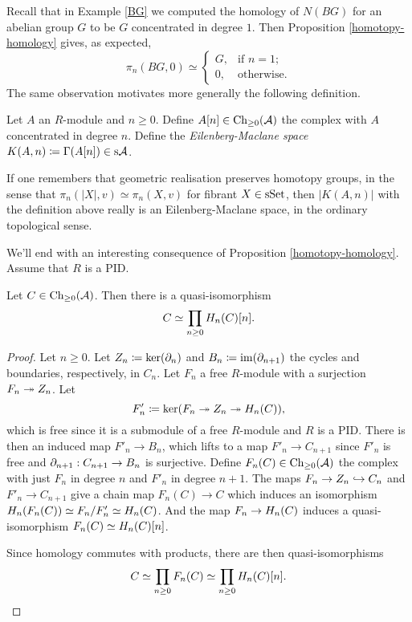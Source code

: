 \begin{remark}
  Recall that in Example \ref{BG} we computed the homology of $N(BG)$
  for an abelian group $G$ to be $G$ concentrated in degree $1$. Then
  Proposition \ref{homotopy-homology} gives, as expected,
  \[
  \pi_n(BG,0) \simeq
  \begin{cases}
    G, & \text{if } n = 1; \\
    0, & \text{otherwise}.
  \end{cases}
  \]
  The same observation motivates more generally the following
  definition.
\end{remark}

\begin{definition}
  Let $A$ an $R$-module and $n \ge 0$. Define $A[n] \in \mathrm{Ch}_{\ge
    0}(\mathcal{A})$ the complex with $A$ concentrated in degree $n$. Define
  the \textit{Eilenberg-Maclane space} $K(A,n) \coloneqq \Gamma(A[n])
  \in \mathrm{s}\mathcal{A}$.
\end{definition}

\begin{remark}
  If one remembers that geometric realisation preserves homotopy
  groups, in the sense that $\pi_n(|X|,v) \simeq \pi_n(X,v)$ for
  fibrant $X \in \mathrm{s}\mathrm{Set}$, then $|K(A,n)|$ with the definition above
  really is an Eilenberg-Maclane space, in the ordinary topological
  sense.
\end{remark}

We'll end with an interesting consequence of Proposition
\ref{homotopy-homology}. Assume that $R$ is a PID.

\begin{lemma}
  \label{quasi-homology}
  Let $C \in \mathrm{Ch}_{\ge 0}(\mathcal{A})$. Then there is a quasi-isomorphism
  \[
  C \simeq \prod_{n \ge 0} H_n(C)[n].
  \]
\end{lemma}

\begin{proof}
  Let $n \ge 0$. Let $Z_n \coloneqq \ker(\partial_n)$ and $B_n \coloneqq
  \operatorname{im}(\partial_{n+1})$ the cycles and boundaries, respectively, in
  $C_n$. Let $F_n$ a free $R$-module with a surjection $F_n \twoheadrightarrow
  Z_n$. Let
  \[
  F'_n \coloneqq \ker(F_n \twoheadrightarrow Z_n \twoheadrightarrow H_n(C)),
  \]
  which is free since it is a submodule of a free $R$-module and $R$
  is a PID. There is then an induced map $F'_n \to B_n$, which lifts
  to a map $F'_n \to C_{n+1}$ since $F'_n$ is free and $\partial_{n+1} :
  C_{n+1} \to B_n$ is surjective. Define $F_n(C) \in \mathrm{Ch}_{\ge 0}(\mathcal{A})$
  the complex with just $F_n$ in degree $n$ and $F'_n$ in degree
  $n+1$. The maps $F_n \to Z_n \hookrightarrow C_n$ and $F'_n \to C_{n+1}$ give a
  chain map $F_n(C) \to C$ which induces an isomorphism $H_n(F_n(C))
  \simeq F_n/F'_n \simeq H_n(C)$. And the map $F_n \to H_n(C)$
  induces a quasi-isomorphism $F_n(C) \simeq H_n(C)[n]$.

  Since homology commutes with products, there are then
  quasi-isomorphisms
  \[
  C \simeq \prod_{n \ge 0} F_n(C) \simeq \prod_{n \ge 0}
  H_n(C)[n]. \qedhere
  \]
\end{proof}

